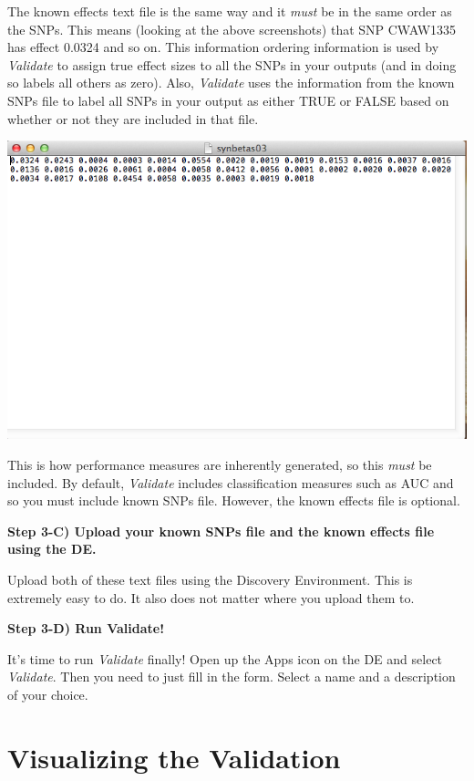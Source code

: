 \documentclass[twoside,a4paper]{refart}
\begin{document}
The known effects text file is the same way and it \textit{must} be in the same order as the SNPs. This means (looking at the above screenshots) that SNP CWAW1335 has effect 0.0324 and so on. This information ordering information is used by \textit{Validate} to assign true effect sizes to all the SNPs in your outputs (and in doing so labels all others as zero). Also, \textit{Validate} uses the information from the known SNPs file to label all SNPs in your output as either TRUE or FALSE based on whether or not they are included in that file. 

\includegraphics[width=\textwidth]{doc_step3_3}

This is how performance measures are inherently generated, so this \textit{must} be included. By default, \textit{Validate} includes classification measures such as AUC and so you must include known SNPs file. However, the known effects file is optional. 

\textbf{Step 3-C) Upload your known SNPs file and the known effects file using the DE.}

Upload both of these text files using the Discovery Environment. This is extremely easy to do. It also does not matter where you upload them to.

\textbf{Step 3-D) Run Validate!}

It's time to run \textit{Validate} finally! Open up the Apps icon on the DE and select \textit{Validate}. Then you need to just fill in the form. Select a name and a description of your choice.



\section{Visualizing the Validation}
\end{document}
